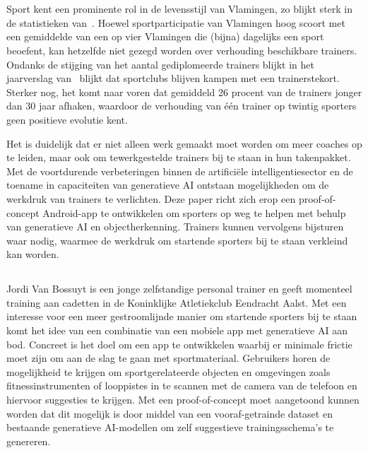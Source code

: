 

\chapter{}
\label{ch:inleiding}
Sport kent een prominente rol in de levensstijl van Vlamingen, zo blijkt sterk in de statistieken van~\textcite{StatistiekVlaanderen2023}.
Hoewel sportparticipatie van Vlamingen hoog scoort met een gemiddelde van een op vier Vlamingen die (bijna) dagelijks een sport beoefent, kan hetzelfde niet gezegd worden over verhouding beschikbare trainers.
Ondanks de stijging van het aantal gediplomeerde trainers blijkt in het jaarverslag van~\textcite{SportVlaanderen2023} blijkt dat sportclubs blijven kampen met een trainerstekort.
Sterker nog, het komt naar voren dat gemiddeld 26 procent van de trainers jonger dan 30 jaar afhaken, waardoor de verhouding van één trainer op twintig sporters geen positieve evolutie kent.

Het is duidelijk dat er niet alleen werk gemaakt moet worden om meer coaches op te leiden, maar ook om tewerkgestelde trainers bij te staan in hun takenpakket.
Met de voortdurende verbeteringen binnen de artifici\"ele intelligentiesector en de toename in capaciteiten van generatieve AI ontstaan mogelijkheden om de werkdruk van trainers te verlichten.
Deze paper richt zich erop een proof-of-concept Android-app te ontwikkelen om sporters op weg te helpen met behulp van generatieve AI en objectherkenning.
Trainers kunnen vervolgens bijsturen waar nodig, waarmee de werkdruk om startende sporters bij te staan verkleind kan worden.

\section{}
\label{sec:probleemstelling}
Jordi Van Bossuyt is een jonge zelfstandige personal trainer en geeft momenteel training aan cadetten in de Koninklijke Atletiekclub Eendracht Aalst.
Met een interesse voor een meer gestroomlijnde manier om startende sporters bij te staan komt het idee van een combinatie van een mobiele app met generatieve AI aan bod.
Concreet is het doel om een app te ontwikkelen waarbij er minimale frictie moet zijn om aan de slag te gaan met sportmateriaal.
Gebruikers horen de mogelijkheid te krijgen om sportgerelateerde objecten en omgevingen zoals fitnessinstrumenten of looppistes in te scannen met de camera van de telefoon en hiervoor suggesties te krijgen.
Met een proof-of-concept moet aangetoond kunnen worden dat dit mogelijk is door middel van een vooraf-getrainde dataset en bestaande generatieve AI-modellen om zelf suggestieve trainingsschema's te genereren.

